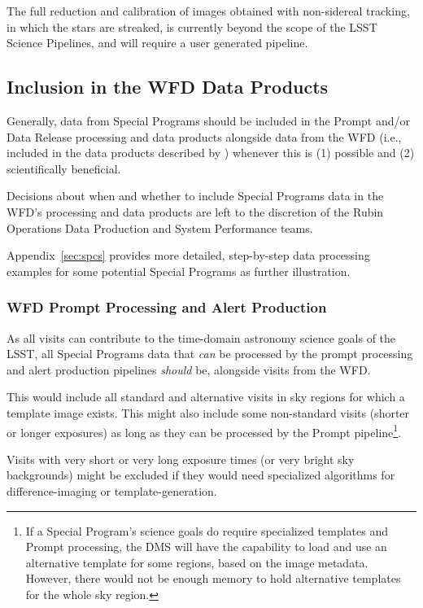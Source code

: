 The full reduction and calibration of images obtained with non-sidereal 
tracking, in which the stars are streaked, is currently beyond the scope 
of the LSST Science Pipelines, and will require a user generated pipeline.


\subsection{Inclusion in the WFD Data Products}\label{ssec:proc_wfd}

Generally, data from Special Programs should be included in the Prompt 
and/or Data Release processing and data products alongside data from the 
WFD (i.e., included in the data products described by ) 
whenever this is (1) possible and (2) scientifically beneficial.

Decisions about when and whether to include Special Programs data in 
the WFD's processing and data products are left to the discretion of the 
Rubin Operations Data Production and System Performance teams.

Appendix~\ref{sec:spcs} provides more detailed, step-by-step data processing 
examples for some potential Special Programs as further illustration. 


\subsubsection{WFD Prompt Processing and Alert Production}

As all visits can contribute to the time-domain astronomy science goals 
of the LSST, all Special Programs data that {\it can} be processed by the 
prompt processing and alert production pipelines {\it should} be, 
alongside visits from the WFD.

This would include all standard and alternative visits in sky regions for which 
a template image exists.
This might also include some non-standard visits (shorter or longer exposures) 
as long as they can be processed by the Prompt 
pipeline\footnote{If a Special Program's science goals do require 
specialized templates and 
Prompt processing, the DMS will have the capability to load and use an 
alternative template for some regions, based on the image metadata. 
However, there would not be enough memory to hold alternative templates 
for the whole sky region.}.

Visits with very short or very long exposure times (or very bright sky 
backgrounds) might be excluded if they would 
need specialized algorithms for difference-imaging or template-generation.

